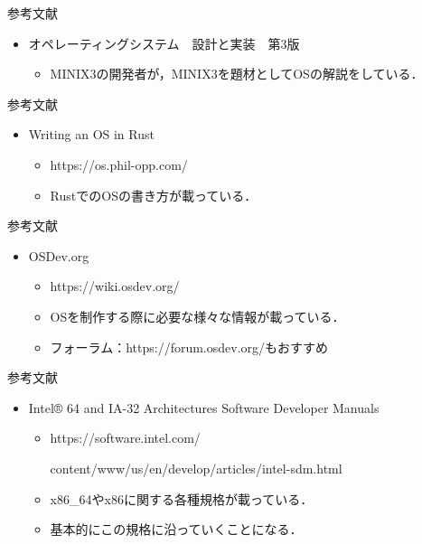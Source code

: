 \documentclass[titlepage,dvipdfmx,uplatex,a4j,12pt]{beamer}
\begin{document}
\begin{frame}{参考文献}
    \begin{itemize}
        \item オペレーティングシステム　設計と実装　第3版
            \begin{itemize}
                \item MINIX3の開発者が，MINIX3を題材としてOSの解説をしている．
            \end{itemize}
    \end{itemize}
\end{frame}

\begin{frame}{参考文献}
    \begin{itemize}
        \item Writing an OS in Rust
            \begin{itemize}
                \item https://os.phil-opp.com/
                \item RustでのOSの書き方が載っている．
            \end{itemize}
    \end{itemize}
\end{frame}

\begin{frame}{参考文献}
    \begin{itemize}
        \item OSDev.org
            \begin{itemize}
                \item https://wiki.osdev.org/
                \item OSを制作する際に必要な様々な情報が載っている．
                \item フォーラム：https://forum.osdev.org/もおすすめ
            \end{itemize}
    \end{itemize}
\end{frame}

\begin{frame}{参考文献}
    \begin{itemize}
        \item Intel® 64 and IA-32 Architectures Software Developer Manuals
            \begin{itemize}
                \item https://software.intel.com/

                    content/www/us/en/develop/articles/intel-sdm.html
                \item x86\_64やx86に関する各種規格が載っている．
                \item 基本的にこの規格に沿っていくことになる．
            \end{itemize}
    \end{itemize}
\end{frame}
\end{document}

